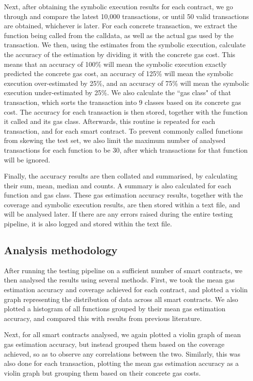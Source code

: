Next, after obtaining the symbolic execution results for each contract, we go through and compare the latest 
10,000 transactions, or until 50 valid transactions are obtained, whichever is later. For each concrete
transaction, we extract the function being called from the calldata, as well as the actual gas used
by the transaction. We then, using the estimates from the symbolic execution, calculate the
accuracy of the estimation by dividing it with the concrete gas cost. This means that an accuracy
of 100\% will mean the symbolic execution exactly predicted the concrete gas cost, an accuracy of 125\%
will mean the symbolic execution over-estimated by 25\%, and an accuracy of 75\% will mean the
symbolic execution under-estimated by 25\%. We also calculate the ``gas class" of that transaction,
which sorts the transaction into 9 classes based on its concrete gas cost.
The accuracy for each transaction is then stored, together
with the function it called and its gas class. Afterwards, this routine is repeated for each transaction,
and for each smart contract.
To prevent commonly called functions from skewing the test set, we also limit the maximum number of
analysed transactions for each function to be 30, after which transactions for that function will be ignored.

Finally, the accuracy results are then collated and summarised, by calculating their sum, mean, median
and counts. A summary is also calculated for each function and gas class.
These gas estimation accuracy results, together with the coverage and symbolic execution results, are then stored within a text file,
and will be analysed later. If there are any errors raised
during the entire testing pipeline, it is also logged and stored within the text file.

\subsection{Analysis methodology}

After running the testing pipeline on a sufficient number of smart contracts, we then analysed the 
results using several methods. First, we took the mean gas estimation accuracy and
coverage achieved for each contract, and plotted a violin graph representing the distribution
of data across all smart contracts. We also plotted a histogram of all functions grouped by their
mean gas estimation accuracy, and compared this with results from previous literature.

Next, for all smart contracts analysed, we again plotted a violin
graph of mean gas estimation accuracy, but instead grouped them based on the coverage achieved, so
as to observe any correlations between the two. Similarly, this was also done for each transaction,
plotting the mean gas estimation accuracy as a violin graph but grouping them based on their 
concrete gas costs.

